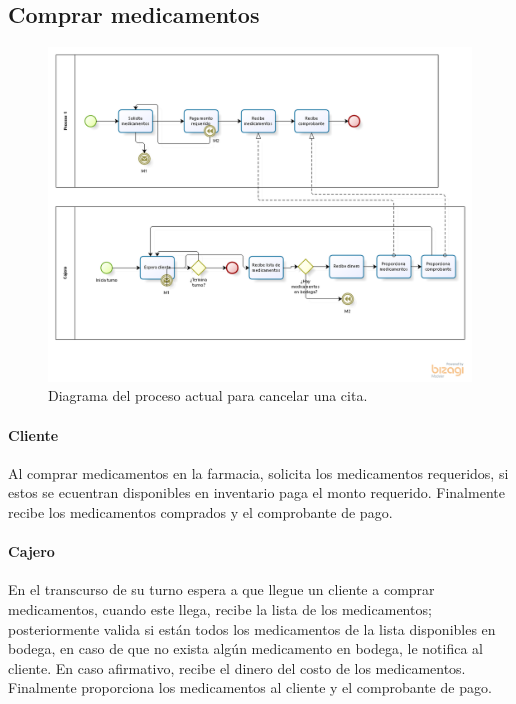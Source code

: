 \subsection{Comprar medicamentos}
\begin{figure}[htbp!]
	\centering
	\includegraphics[width=\textwidth]{images/procesos/medicamentos_old}
	\caption{Diagrama del proceso actual para cancelar una cita.}
\end{figure}
\paragraph{Cliente}
Al comprar medicamentos en la farmacia, solicita los medicamentos requeridos, si estos se ecuentran disponibles en inventario paga el monto requerido. Finalmente recibe los medicamentos comprados y el comprobante de pago.
\paragraph{Cajero}
En el transcurso de su turno espera a que llegue un cliente a comprar medicamentos, cuando este llega, recibe la lista de los medicamentos; posteriormente valida si están todos los medicamentos de la lista disponibles en bodega, en caso de que no exista algún medicamento en bodega, le notifica al cliente. En caso afirmativo, recibe el dinero del costo de los medicamentos. Finalmente proporciona los medicamentos al cliente y el comprobante de pago.
    \newpage
